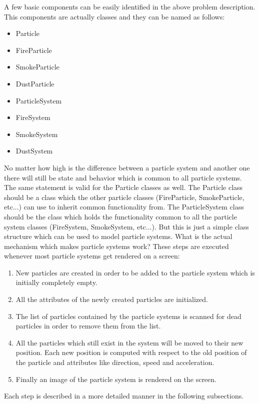 A few basic components can be easily identified in the above problem description. This components are actually classes and they can be named as follows:

\begin{itemize}
	\item Particle
	\item FireParticle
	\item SmokeParticle
	\item DustParticle
	\item ParticleSystem
	\item FireSystem
	\item SmokeSystem
	\item DustSystem
\end{itemize}

No matter how high is the difference between a particle system and another one there will still be state and behavior which is common to all particle systems. The same statement is valid for the Particle classes as well. The Particle class should be a class which the other particle classes (FireParticle, SmokeParticle, etc...) can use to inherit common functionality from. The ParticleSystem class should be the class which holds the functionality common to all the particle system classes (FireSystem, SmokeSystem, etc...). But this is just a simple class structure which can be used to model particle systems. What is the actual mechanism which makes particle systems work? These steps are executed whenever most particle systems get rendered on a screen:

\begin{enumerate}
	\item New particles are created in order to be added to the particle system which is initially completely empty.
	\item All the attributes of the newly created particles are initialized.
	\item The list of particles contained by the particle systems is scanned for dead particles in order to remove them from the list.
	\item All the particles which still exist in the system will be moved to their new position. Each new position is computed with respect to the old position of the particle and attributes like direction, speed and acceleration.
	\item Finally an image of the particle system is rendered on the screen.
\end{enumerate}

Each step is described in a more detailed manner in the following subsections.

